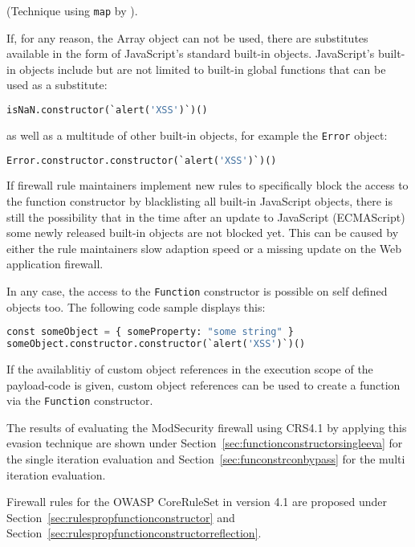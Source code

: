 (Technique using \verb|map| by \cite{mk/elementsVid}).

If, for any reason, the Array object can not be used, there are substitutes available in the form of JavaScript's standard built-in objects. \cite{js/builtin}
JavaScript's built-in objects include but are not limited to built-in global functions that can be used as a substitute:

\begin{lstlisting}[style=basicStyle,language=Python,escapeinside=\^\^]
isNaN.constructor(`alert('XSS')`)()
\end{lstlisting}

as well as a multitude of other built-in objects, for example the \verb|Error| object:

\begin{lstlisting}[style=basicStyle,language=Python,escapeinside=\^\^]
Error.constructor.constructor(`alert('XSS')`)()
\end{lstlisting}

If firewall rule maintainers implement new rules to specifically block the access to the function constructor by blacklisting all built-in JavaScript objects, there is still the possibility that in the time after an update to JavaScript (ECMAScript) some newly released built-in objects are not blocked yet. This can be caused by either the rule maintainers slow adaption speed or a missing update on the Web application firewall.

In any case, the access to the \verb|Function| constructor is possible on self defined objects too. The following code sample displays this:

\begin{lstlisting}[style=basicStyle,language=Python,escapeinside=\^\^]
const someObject = { someProperty: "some string" }
someObject.constructor.constructor(`alert('XSS')`)()
\end{lstlisting}

If the availablitiy of custom object references in the execution scope of the payload-code is given, custom object references can be used to create a function via the \verb|Function| constructor. 

The results of evaluating the ModSecurity firewall using CRS4.1 by applying this evasion technique are shown under Section~\ref{sec:functionconstructorsingleeva} for the single iteration evaluation and Section~\ref{sec:funconstrconbypass} for the multi iteration evaluation.

Firewall rules for the OWASP CoreRuleSet in version 4.1 are proposed under Section~\ref{sec:rulespropfunctionconstructor} and Section~\ref{sec:rulespropfunctionconstructorreflection}.


